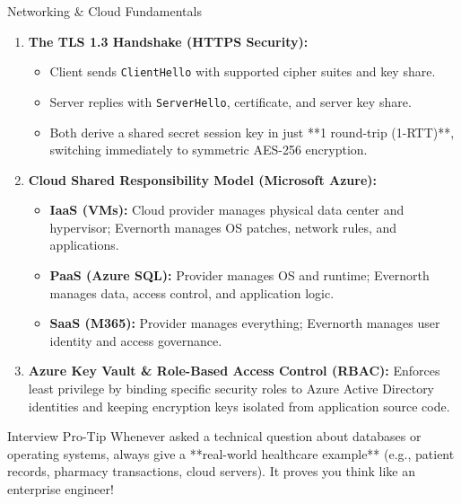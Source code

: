 \documentclass[11pt,a4paper]{article}
\begin{document}
\begin{techbox}{Networking \& Cloud Fundamentals}
\begin{enumerate}
    \item \textbf{The TLS 1.3 Handshake (HTTPS Security):}
    \begin{itemize}
        \item Client sends \texttt{ClientHello} with supported cipher suites and key share.
        \item Server replies with \texttt{ServerHello}, certificate, and server key share.
        \item Both derive a shared secret session key in just **1 round-trip (1-RTT)**, switching immediately to symmetric AES-256 encryption.
    \end{itemize}
    \item \textbf{Cloud Shared Responsibility Model (Microsoft Azure):}
    \begin{itemize}
        \item \textbf{IaaS (VMs):} Cloud provider manages physical data center and hypervisor; Evernorth manages OS patches, network rules, and applications.
        \item \textbf{PaaS (Azure SQL):} Provider manages OS and runtime; Evernorth manages data, access control, and application logic.
        \item \textbf{SaaS (M365):} Provider manages everything; Evernorth manages user identity and access governance.
    \end{itemize}
    \item \textbf{Azure Key Vault \& Role-Based Access Control (RBAC):}
    Enforces least privilege by binding specific security roles to Azure Active Directory identities and keeping encryption keys isolated from application source code.
\end{enumerate}
\end{techbox}

\begin{trapbox}{Interview Pro-Tip}
Whenever asked a technical question about databases or operating systems, always give a **real-world healthcare example** (e.g., patient records, pharmacy transactions, cloud servers). It proves you think like an enterprise engineer!
\end{trapbox}
\end{document}
